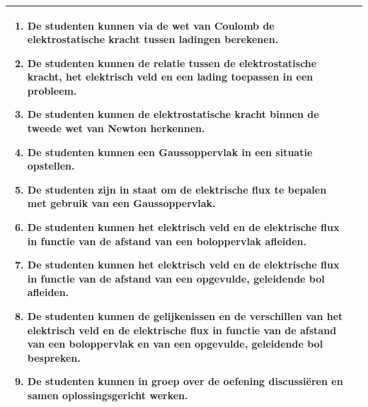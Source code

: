 \begin{landscape}
\begin{tabularx}{1.56\textwidth}{|p{}|X|}
\begin{enumerate}[itemsep=0.08\baselineskip]
			\item De studenten kunnen via de wet van Coulomb de elektrostatische kracht tussen ladingen berekenen.
			\item De studenten kunnen de relatie tussen de elektrostatische kracht, het elektrisch veld en een lading toepassen in een probleem.
			\item De studenten kunnen de elektrostatische kracht binnen de tweede wet van Newton herkennen.
			\item De studenten kunnen een Gaussoppervlak in een situatie opstellen.
			\item De studenten zijn in staat om de elektrische flux te bepalen met gebruik van een Gaussoppervlak.
			\item De studenten kunnen het elektrisch veld en de elektrische flux  in functie van de afstand  van een boloppervlak afleiden.
			\item De studenten kunnen het elektrisch veld en de elektrische flux  in functie van de afstand van een opgevulde, geleidende bol afleiden.
			\item De studenten kunnen de gelijkenissen en de verschillen van het elektrisch veld en de elektrische flux in functie van de afstand van een boloppervlak en van een opgevulde, geleidende bol bespreken.
		    \item De studenten kunnen in groep over de oefening discussiëren en samen oplossingsgericht werken.
		\end{enumerate} \\\hline
	\end{tabularx}



\end{landscape}
